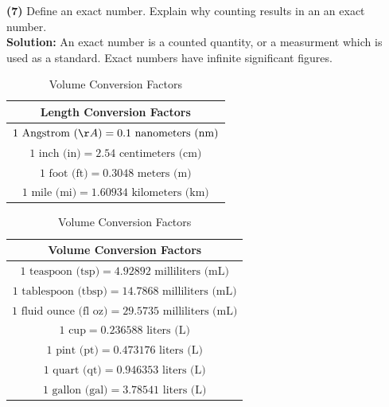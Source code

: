 \documentclass{article}
\begin{document}
\textbf{(7)} Define an exact number. Explain why counting results in an an exact number. \\
\textbf{Solution:} An exact number is a counted quantity, or a measurment which is used as a standard. Exact numbers have infinite significant figures. \\
\begin{table}
    \centering
    \begin{minipage}[t]{0.48\linewidth}
        \centering

        \begin{tabular}{|c|}
            \hline
            \textbf{Length Conversion Factors} \\
            \hline
            $1 \text{ Angstrom ($\AA$)} = 0.1 \text{ nanometers (nm)}$ \\
            $1 \text{ inch (in)} = 2.54 \text{ centimeters (cm)}$ \\
            $1 \text{ foot (ft)} = 0.3048 \text{ meters (m)}$ \\
            $1 \text{ mile (mi)} = 1.60934 \text{ kilometers (km)}$ \\
            \hline
        \end{tabular}
        \caption{Length Conversion Factors}
        \label{tab:length_conversions}
        \vspace{1cm}
        \begin{tabular}{|c|}
            \hline
            \textbf{Volume Conversion Factors} \\
            \hline
            $1 \text{ teaspoon (tsp)} = 4.92892 \text{ milliliters (mL)}$ \\
            $1 \text{ tablespoon (tbsp)} = 14.7868 \text{ milliliters (mL)}$ \\
            $1 \text{ fluid ounce (fl oz)} = 29.5735 \text{ milliliters (mL)}$ \\
            $1 \text{ cup} = 0.236588 \text{ liters (L)}$ \\
            $1 \text{ pint (pt)} = 0.473176 \text{ liters (L)}$ \\
            $1 \text{ quart (qt)} = 0.946353 \text{ liters (L)}$ \\
            $1 \text{ gallon (gal)} = 3.78541 \text{ liters (L)}$ \\
            \hline
        \end{tabular}
        \caption{Volume Conversion Factors}
        \label{tab:volume_conversions}

\end{minipage}
\end{table}
\end{document}
